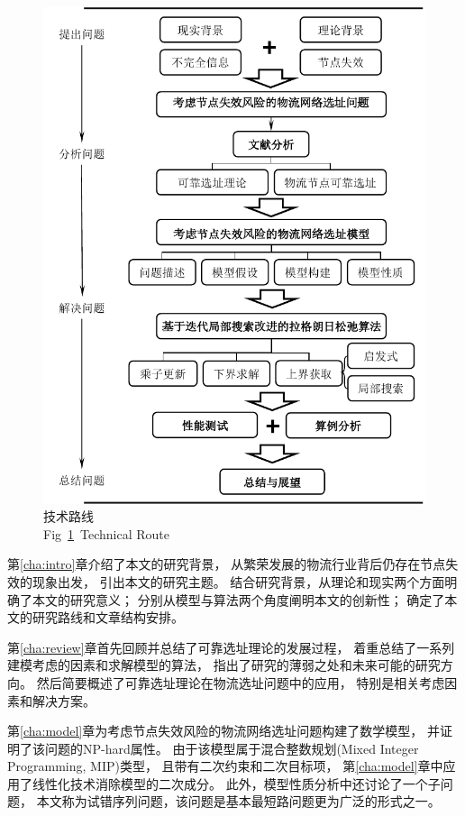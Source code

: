 \begin{figure}[t] 
  \setlength{\belowcaptionskip}{-0.5cm} 
  \centering
  \includegraphics[height=0.7\textheight]{figures/route_.pdf}
  \caption{技术路线 \\Fig~\ref{fig:技术路线}~Technical Route}
  \label{fig:技术路线}
\end{figure}

第\ref{cha:intro}章介绍了本文的研究背景，
从繁荣发展的物流行业背后仍存在节点失效的现象出发，
引出本文的研究主题。
结合研究背景，从理论和现实两个方面明确了本文的研究意义；
分别从模型与算法两个角度阐明本文的创新性；
确定了本文的研究路线和文章结构安排。

第\ref{cha:review}章首先回顾并总结了可靠选址理论的发展过程，
着重总结了一系列建模考虑的因素和求解模型的算法，
指出了研究的薄弱之处和未来可能的研究方向。
然后简要概述了可靠选址理论在物流选址问题中的应用，
特别是相关考虑因素和解决方案。

第\ref{cha:model}章为考虑节点失效风险的物流网络选址问题构建了数学模型，
并证明了该问题的NP-hard属性。
由于该模型属于混合整数规划(Mixed Integer Programming, MIP)类型，
且带有二次约束和二次目标项，
第\ref{cha:model}章中应用了线性化技术消除模型的二次成分。
此外，模型性质分析中还讨论了一个子问题，
本文称为试错序列问题，该问题是基本最短路问题更为广泛的形式之一。

